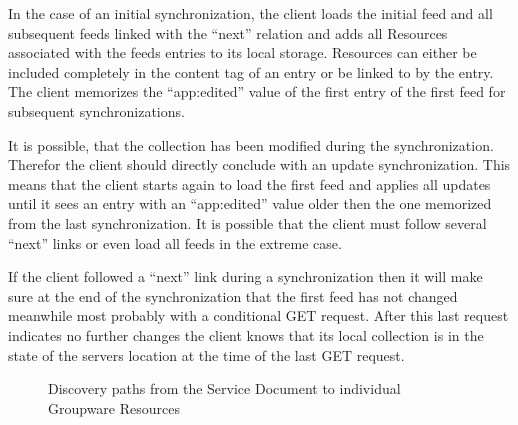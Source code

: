 \documentclass[12pt,a4paper,twoside]{scrartcl}		%
\begin{document}
In the case of an initial synchronization, the client loads the initial feed and
all subsequent feeds linked with the ``next'' relation and adds all Resources
associated with the feeds entries to its local storage. Resources can either be
included completely in the content tag of an entry or be linked to by the
entry. The client memorizes the ``app:edited'' value of the first entry of the
first feed for subsequent synchronizations.

It is possible, that the collection has been modified during the
synchronization. Therefor the client should directly conclude with an update
synchronization. This means that the client starts again to load the first feed
and applies all updates until it sees an entry with an ``app:edited'' value
older then the one memorized from the last synchronization. It is possible that
the client must follow several ``next'' links or even load all feeds in the
extreme case.

If the client followed a ``next'' link during a synchronization then it will
make sure at the end of the synchronization that the first feed has not changed
meanwhile most probably with a conditional GET request. After this last request
indicates no further changes the client knows that its local collection is in
the state of the servers location at the time of the last GET request.

\begin{figure}[tb]

  \caption{Discovery paths from the Service Document to individual Groupware Resources}
\end{figure}
\end{document}
